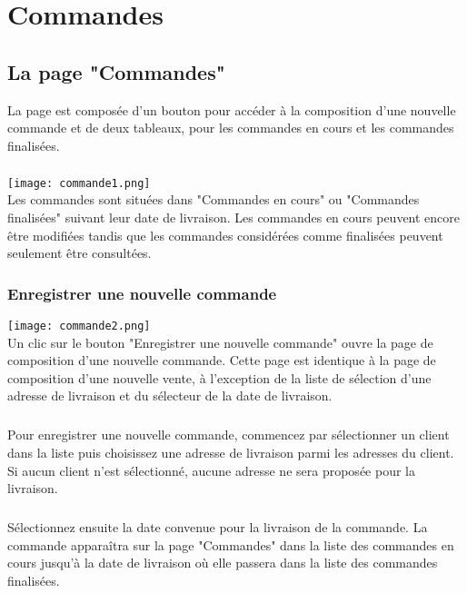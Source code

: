 \chapter{Commandes}

\section{La page "Commandes"}
La page est composée d'un bouton pour accéder à la composition d'une nouvelle
commande et de deux tableaux, pour les commandes en cours et les commandes
finalisées.

\paragraph{}

\texttt{[image: commande1.png]}\\

Les commandes sont situées dans "Commandes en cours" ou "Commandes finalisées"
suivant leur date de livraison. Les commandes en cours peuvent encore être
modifiées tandis que les commandes considérées comme finalisées peuvent
seulement être consultées.

\subsection{Enregistrer une nouvelle commande}

\texttt{[image: commande2.png]}\\

Un clic sur le bouton "Enregistrer une nouvelle commande" ouvre la page de
composition d'une nouvelle commande. Cette page est identique à la page de
composition d'une nouvelle vente, à l'exception de la liste de sélection
d'une adresse de livraison et du sélecteur de la date de livraison.

\paragraph{}
Pour enregistrer une nouvelle commande, commencez par sélectionner un client
dans la liste puis choisissez une adresse de livraison parmi les adresses du
client. Si aucun client n'est sélectionné, aucune adresse ne sera
proposée pour la livraison.

\paragraph{}
Sélectionnez ensuite la date convenue pour la livraison de la commande.
La commande apparaîtra sur la page "Commandes" dans la liste des commandes en
cours jusqu'à la date de livraison où elle passera dans la liste des commandes
finalisées.

